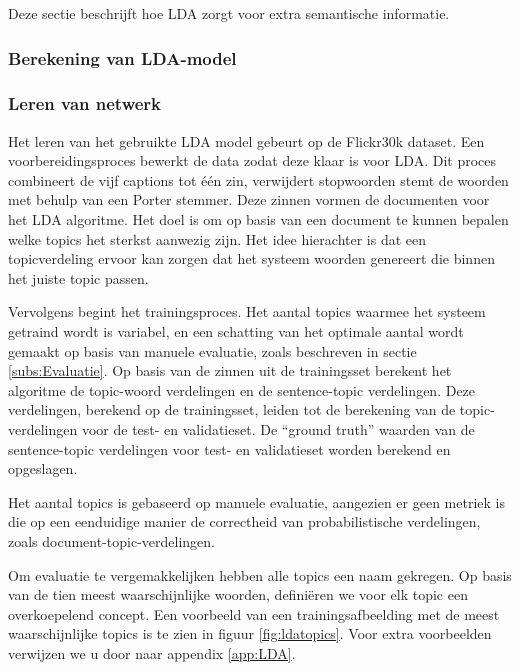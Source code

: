  Deze sectie beschrijft hoe LDA zorgt voor extra semantische informatie.

\subsubsection{Berekening van LDA-model}
\label{subs:Berekening van topicverdeling}

\subsubsection{Leren van netwerk}
Het leren van het gebruikte LDA model gebeurt op de Flickr30k dataset. Een voorbereidingsproces bewerkt de data zodat deze klaar is voor LDA. Dit proces combineert de vijf captions tot \'e\'en zin, verwijdert stopwoorden stemt de woorden met behulp van een Porter stemmer.  Deze zinnen vormen de documenten voor het LDA algoritme. Het doel is om op basis van een document te kunnen bepalen welke topics het sterkst aanwezig zijn. Het idee hierachter is dat een topicverdeling ervoor kan zorgen dat het systeem woorden genereert die binnen het juiste topic passen.

Vervolgens begint het trainingsproces. Het aantal topics waarmee het systeem getraind wordt is variabel, en een schatting van het optimale aantal wordt gemaakt op basis van manuele evaluatie, zoals beschreven in sectie \ref{subs:Evaluatie}. Op basis van de zinnen uit de trainingsset berekent het algoritme de topic-woord verdelingen en de sentence-topic verdelingen. Deze verdelingen, berekend op de trainingsset, leiden tot de berekening van de topic-verdelingen voor de test- en validatieset. De ``ground truth'' waarden van de sentence-topic verdelingen voor test- en validatieset worden berekend en opgeslagen.

Het aantal topics is gebaseerd op manuele evaluatie, aangezien er geen metriek is die op een eenduidige manier de correctheid van probabilistische verdelingen, zoals document-topic-verdelingen.  

Om evaluatie te vergemakkelijken hebben alle topics een naam gekregen. Op basis van de tien meest waarschijnlijke woorden, defini\"eren we voor elk topic een overkoepelend concept.  Een voorbeeld van een trainingsafbeelding met de meest waarschijnlijke topics is te zien in figuur \ref{fig:ldatopics}. Voor extra voorbeelden verwijzen we u door naar appendix \ref{app:LDA}.

